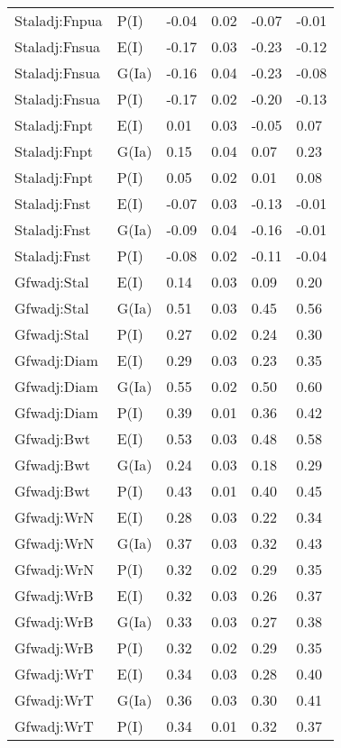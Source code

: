 \begin{center}
\begin{longtable}{|p{1.1in}|p{0.7in}|p{0.7in}|p{0.6in}|p{0.6in}|p{0.6in}|}
  Staladj:Fnpua & P(I) & -0.04 & 0.02 & -0.07 & -0.01 \\ 
  Staladj:Fnsua & E(I) & -0.17 & 0.03 & -0.23 & -0.12 \\ 
  Staladj:Fnsua & G(Ia) & -0.16 & 0.04 & -0.23 & -0.08 \\ 
  Staladj:Fnsua & P(I) & -0.17 & 0.02 & -0.20 & -0.13 \\ 
  Staladj:Fnpt & E(I) & 0.01 & 0.03 & -0.05 & 0.07 \\ 
  Staladj:Fnpt & G(Ia) & 0.15 & 0.04 & 0.07 & 0.23 \\ 
  Staladj:Fnpt & P(I) & 0.05 & 0.02 & 0.01 & 0.08 \\ 
  Staladj:Fnst & E(I) & -0.07 & 0.03 & -0.13 & -0.01 \\ 
  Staladj:Fnst & G(Ia) & -0.09 & 0.04 & -0.16 & -0.01 \\ 
  Staladj:Fnst & P(I) & -0.08 & 0.02 & -0.11 & -0.04 \\ 
  Gfwadj:Stal & E(I) & 0.14 & 0.03 & 0.09 & 0.20 \\ 
  Gfwadj:Stal & G(Ia) & 0.51 & 0.03 & 0.45 & 0.56 \\ 
  Gfwadj:Stal & P(I) & 0.27 & 0.02 & 0.24 & 0.30 \\ 
  Gfwadj:Diam & E(I) & 0.29 & 0.03 & 0.23 & 0.35 \\ 
  Gfwadj:Diam & G(Ia) & 0.55 & 0.02 & 0.50 & 0.60 \\ 
  Gfwadj:Diam & P(I) & 0.39 & 0.01 & 0.36 & 0.42 \\ 
  Gfwadj:Bwt & E(I) & 0.53 & 0.03 & 0.48 & 0.58 \\ 
  Gfwadj:Bwt & G(Ia) & 0.24 & 0.03 & 0.18 & 0.29 \\ 
  Gfwadj:Bwt & P(I) & 0.43 & 0.01 & 0.40 & 0.45 \\ 
  Gfwadj:WrN & E(I) & 0.28 & 0.03 & 0.22 & 0.34 \\ 
  Gfwadj:WrN & G(Ia) & 0.37 & 0.03 & 0.32 & 0.43 \\ 
  Gfwadj:WrN & P(I) & 0.32 & 0.02 & 0.29 & 0.35 \\ 
  Gfwadj:WrB & E(I) & 0.32 & 0.03 & 0.26 & 0.37 \\ 
  Gfwadj:WrB & G(Ia) & 0.33 & 0.03 & 0.27 & 0.38 \\ 
  Gfwadj:WrB & P(I) & 0.32 & 0.02 & 0.29 & 0.35 \\ 
  Gfwadj:WrT & E(I) & 0.34 & 0.03 & 0.28 & 0.40 \\ 
  Gfwadj:WrT & G(Ia) & 0.36 & 0.03 & 0.30 & 0.41 \\ 
  Gfwadj:WrT & P(I) & 0.34 & 0.01 & 0.32 & 0.37 \\ 

\end{longtable}
\end{center}
